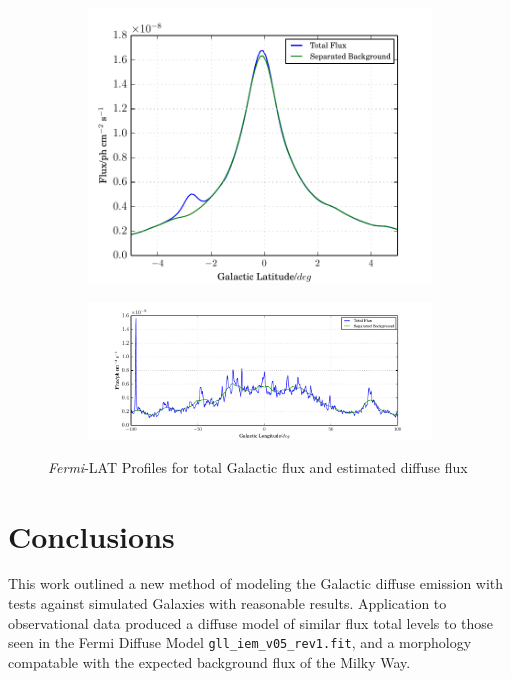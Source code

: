 \documentclass{PoS}
\begin{document}
\begin{figure}
\centering
\begin{subfigure}{0.33\textwidth}
      \includegraphics[width=\textwidth]{figures/GLAT.pdf}
\end{subfigure}
\begin{subfigure}{0.66\textwidth}
        \includegraphics[width=\textwidth]{figures/GLON.pdf}
\end{subfigure}
\caption{\textit{Fermi}-LAT Profiles for total Galactic flux and estimated diffuse flux}
\end{figure}

\section{Conclusions}

This work outlined a new method of modeling the Galactic diffuse emission with tests against simulated Galaxies with reasonable results. Application to observational data produced a diffuse model of similar flux total levels to those seen in the Fermi Diffuse Model \verb|gll_iem_v05_rev1.fit|, and a morphology compatable with the expected background flux of the Milky Way.
\end{document}
